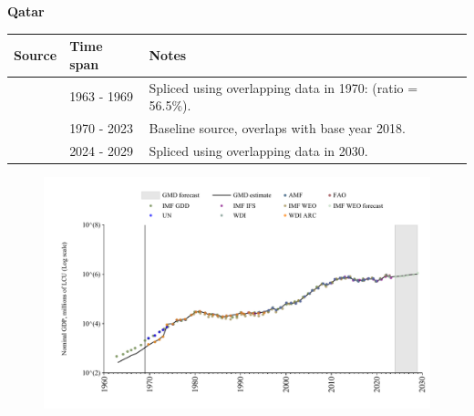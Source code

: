 \documentclass[12pt,a4paper,landscape]{article}
\begin{document}
\begin{adjustbox}{max totalsize={\paperwidth}{\paperheight},center}
\begin{minipage}[t][\textheight][t]{\textwidth}
\vspace*{0.5cm}
{}
\begin{center}
{\Large\bfseries Qatar}
\end{center}
\vspace{0.5cm}
\begin{table}[H]
\centering
\small
\begin{tabular}{|l|l|l|}
\hline
\textbf{Source} & \textbf{Time span} & \textbf{Notes} \\
\hline
\rowcolor{white}\cite{IMF_GDD}& 1963 - 1969 &Spliced using overlapping data in 1970: (ratio = 56.5\%).\\
\rowcolor{lightgray}\cite{WDI}& 1970 - 2023 &Baseline source, overlaps with base year 2018.\\
\rowcolor{white}\cite{IMF_WEO_forecast}& 2024 - 2029 &Spliced using overlapping data in 2030.\\
\hline
\end{tabular}
\end{table}
\begin{figure}[H]
\centering
\includegraphics[width=\textwidth,height=0.6\textheight,keepaspectratio]{graphs/QAT_nGDP.pdf}
\end{figure}
\end{minipage}
\end{adjustbox}
\end{document}
